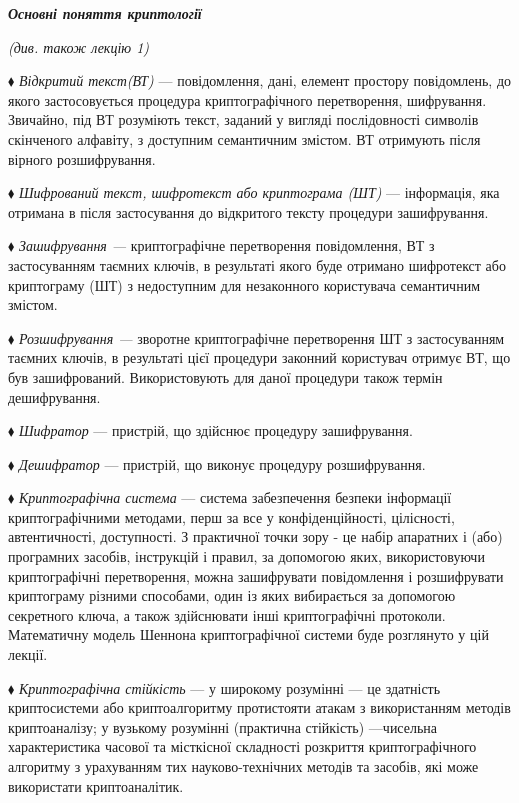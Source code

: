 \bigskip


\bigskip

{\centering\bfseries\itshape
Основні поняття криптології
\par}

{\centering\itshape
(див. також лекцію 1)
\par}


\bigskip


\bigskip

$\blacklozenge$ \textit{Відкритий текст(ВТ)} --- повідомлення, дані, елемент
простору повідомлень, до якого застосовується процедура криптографічного
перетворення, шифрування. Звичайно, під ВТ розуміють текст, заданий у вигляді
послідовності символів скінченого алфавіту, з доступним семантичним змістом. ВТ
отримують після вірного розшифрування.

$\blacklozenge$ \textit{Шифрований текст, шифротекст  або криптограма (ШТ)} ---
інформація, яка отримана в після застосування до відкритого тексту процедури
зашифрування.

$\blacklozenge$ \textit{Зашифрування --- }криптографічне перетворення
повідомлення, ВТ з застосуванням таємних ключів, в результаті якого буде
отримано \textit{ }шифротекст  або криптограму (ШТ) з недоступним для
незаконного користувача семантичним змістом.

$\blacklozenge$ \textit{Розшифрування --- }зворотне \textit{ }криптографічне
перетворення ШТ з застосуванням таємних ключів, в результаті цієї процедури
законний користувач отримує ВТ, що був зашифрований.  Використовують для даної
процедури також термін дешифрування.

$\blacklozenge$ \textit{Шифратор }--- пристрій, що здійснює процедуру
зашифрування.

$\blacklozenge$ \textit{Дешифратор }--- пристрій, що виконує процедуру
розшифрування.

$\blacklozenge$ \textit{Криптографічна система }--- система забезпечення безпеки
інформації криптографічними методами, перш за все у конфіденційності,
цілісності, автентичності, доступності. З практичної точки зору -  це набір
апаратних і (або) програмних засобів, інструкцій і правил, за допомогою яких,
використовуючи криптографічні перетворення, можна зашифрувати  повідомлення і
розшифрувати криптограму різними способами, один із яких вибирається за
допомогою секретного ключа, а також здійснювати інші криптографічні протоколи.
Математичну модель Шеннона криптографічної системи буде розглянуто у цій
лекції.

$\blacklozenge$ \textit{Криптографічна стійкість }--- у широкому розумінні --- це
здатність криптосистеми або криптоалгоритму протистояти атакам з використанням
методів криптоаналізу; у вузькому розумінні (практична стійкість) ---чисельна
характеристика часової та місткісної складності розкриття криптографічного
алгоритму з урахуванням тих науково-технічних методів та засобів, які може
використати криптоаналітик.

